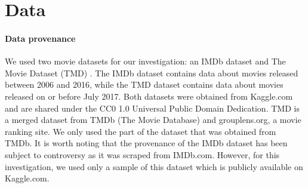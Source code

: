 \section{Data}

    \paragraph{Data provenance}
        We used two movie datasets for our investigation: an IMDb dataset
            \cite*{data:IMDb} and The Movie Dataset (TMD) \cite*{data:TMD}. 
        The IMDb dataset contains data about movies released between 2006 and 2016, while
            the TMD dataset contains data about movies released on or before July
            2017.
        Both datasets were obtained from Kaggle.com and are shared under
            the CC0 1.0 Universal Public Domain Dedication.
        TMD is a merged dataset from TMDb (The Movie Database) and grouplens.org, a movie ranking site.
        We only used the part of the dataset that was obtained from TMDb.
        It is worth noting that the provenance of the IMDb dataset has been subject to
            controversy as it was scraped from IMDb.com. 
        However, for this investigation, we used only a sample of this dataset which is publicly
            available on Kaggle.com.


